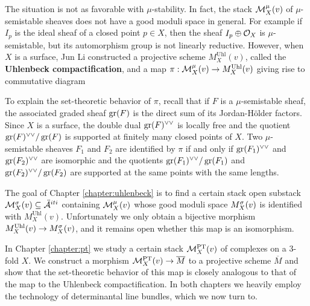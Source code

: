 The situation is not as favorable with $\mu$-stability. In fact, the stack $\mathcal{M}^{\mu}_X(v)$ of $\mu$-semistable sheaves does not have a good moduli space in general. For example if $I_p$ is the ideal sheaf of a closed point $p \in X$, then the sheaf $I_p \oplus \mathcal{O}_X$ is $\mu$-semistable, but its automorphism group is not linearly reductive. However, when $X$ is a surface, Jun Li \cite{li} constructed a projective scheme $M^{\text{Uhl}}_X(v)$, called the \textbf{Uhlenbeck compactification}, and a map $\pi: \mathcal{M}^\mu_X(v) \to M^{\text{Uhl}}_X(v)$ giving rise to commutative diagram
\begin{center}
\end{center}
To explain the set-theoretic behavior of $\pi$, recall that if $F$ is a $\mu$-semistable sheaf, the associated graded sheaf $\operatorname{\mathrm{gr}}(F)$ is the direct sum of its Jordan-H\"older factors. Since $X$ is a surface, the double dual $\operatorname{\mathrm{gr}}(F)^{\vee\vee}$ is locally free and the quotient $\operatorname{\mathrm{gr}}(F)^{\vee\vee}/\operatorname{\mathrm{gr}}(F)$ is supported at finitely many closed points of $X$. Two $\mu$-semistable sheaves $F_1$ and $F_2$ are identified by $\pi$ if and only if $\operatorname{\mathrm{gr}}(F_1)^{\vee\vee}$ and $\operatorname{\mathrm{gr}}(F_2)^{\vee\vee}$ are isomorphic and the quotients $\operatorname{\mathrm{gr}}(F_1)^{\vee\vee}/\operatorname{\mathrm{gr}}(F_1)$ and $\operatorname{\mathrm{gr}}(F_2)^{\vee\vee}/\operatorname{\mathrm{gr}}(F_2)$ are supported at the same points with the same lengths.

The goal of Chapter \ref{chapter:uhlenbeck} is to find a certain stack open substack $\mathcal{M}^\sigma_X(v) \subseteq \ddot{\mathcal{A}}^{iti}$ containing $\mathcal{M}^\mu_X(v)$ whose good moduli space $M^\sigma_X(v)$ is identified with $M^{\text{Uhl}}_X(v)$. Unfortunately we only obtain a bijective morphism $M^{\text{Uhl}}_X(v) \to M^\sigma_X(v)$, and it remains open whether this map is an isomorphism.

In Chapter \ref{chapter:pt} we study a certain stack $\mathcal{M}^{\text{PT}}_X(v)$ of complexes on a 3-fold $X$. We construct a morphism $\mathcal{M}^{\text{PT}}_X(v) \to \overline{M}$ to a projective scheme $\overline{M}$ and show that the set-theoretic behavior of this map is closely analogous to that of the map to the Uhlenbeck compactification. In both chapters we heavily employ the technology of determinantal line bundles, which we now turn to.


